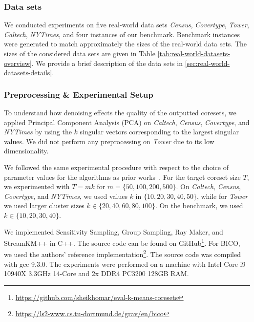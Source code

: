 \subsubsection*{Data sets}
We conducted experiments on five real-world data sets
\textit{Census},
\textit{Covertype},
\textit{Tower},
\textit{Caltech},
\textit{NYTimes},
and four instances of our benchmark. Benchmark instances were generated to match approximately the sizes of the real-world data sets. 
The sizes of the considered data sets are given in Table \ref{tab:real-world-datasets-overview}.
We provide a brief description of the data sets in \cref{sec:real-world-datasets-details}.


\subsubsection*{Preprocessing \& Experimental Setup}
To understand how denoising effects the quality of the outputted coresets, we applied Principal Component Analysis (PCA) on \textit{Caltech}, \textit{Census}, \textit{Covertype}, and \textit{NYTimes} by using the $k$ singular vectors corresponding to the largest singular values. 
We did not perform any preprocessing on \textit{Tower} due to its low dimensionality.

We followed the same experimental procedure with respect to the choice of parameter values for the algorithms as prior works~\cite{AckermannMRSLS12, FGSSS13}. For the target coreset size $T$, we experimented with $T=mk$ for $m = \{50, 100, 200, 500\}$. On \textit{Caltech}, \textit{Census},  \textit{Covertype}, and \textit{NYTimes}, we used values $k$ in $\{10, 20, 30, 40, 50\}$, while for \textit{Tower} we used larger cluster sizes $k \in \{20, 40, 60, 80, 100\}$. On the benchmark, we used  $k \in \{10, 20, 30, 40\}$.


We implemented Sensitivity Sampling, Group Sampling, Ray Maker, and StreamKM++ in C++. The source code can be found on GitHub\footnote{\url{https://github.com/sheikhomar/eval-k-means-coresets}}. For BICO, we used the authors' reference implementation\footnote{\url{https://ls2-www.cs.tu-dortmund.de/grav/en/bico}}. The source code was compiled with gcc 9.3.0. The experiments were performed on a machine with Intel Core i9 10940X 3.3GHz 14-Core and 2x DDR4 PC3200 128GB RAM.


%


%



